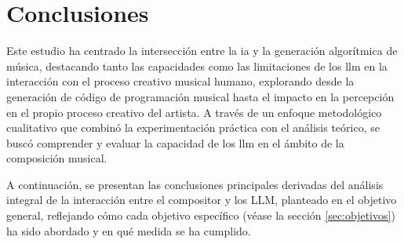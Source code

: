 \chapter{Conclusiones}



Este estudio ha centrado la intersección entre la \gls{ia} y la generación algorítmica de música, destacando tanto las capacidades como las limitaciones de los \gls{llm} en la interacción con el proceso creativo musical humano, explorando desde la generación de código de programación musical hasta el impacto en la percepción en el propio proceso creativo del artista. A través de un enfoque metodológico cualitativo que combinó la experimentación práctica con el análisis teórico, se buscó comprender y evaluar la capacidad de los \gls{llm} en el ámbito de la composición musical. 


A continuación, se presentan las conclusiones principales derivadas del análisis integral de la interacción entre el compositor y los LLM, planteado en el objetivo general, reflejando cómo cada objetivo específico (véase la sección \ref{sec:objetivos}) ha sido abordado y en qué medida se ha cumplido. 

